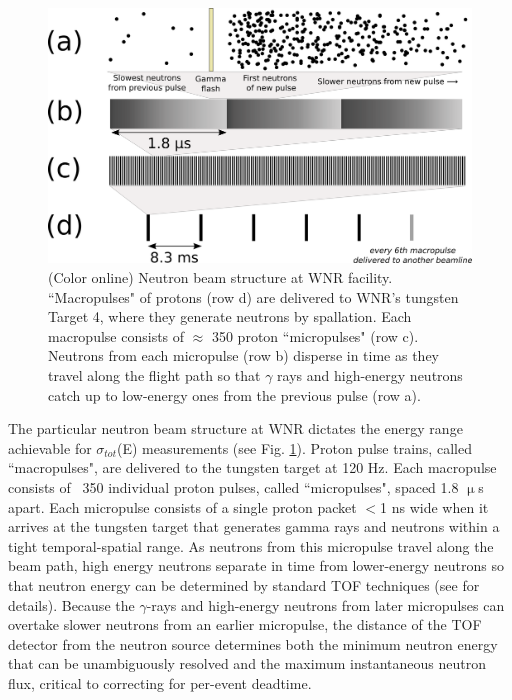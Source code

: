 \documentclass[twocolumn,secnumarabic,amssymb, nobibnotes, aps, prl,
superscriptaddress, nobalancelastpage]{revtex4}
\newcommand{\totEs}{\ensuremath{\sigma_{tot}}(E)\,\,}
\begin{document}
\begin{figure}
    \includegraphics[scale=0.4]{figures/beamStructure.png}
    \caption{(Color online) Neutron beam structure at WNR facility.
        ``Macropulses" of protons (row d) are delivered to
        WNR's tungsten Target 4, where they generate neutrons by spallation.
        Each macropulse consists of
        $\approx$ 350 proton ``micropulses" (row c). Neutrons
        from each micropulse (row b) disperse in
        time as they travel along the flight path so that $\gamma$ rays and high-energy 
    neutrons catch up to low-energy ones from the previous pulse (row a).}
    \label{BeamStructure}
\end{figure}

The particular neutron beam structure at WNR dictates the energy range
achievable for \totEs measurements (see Fig. \ref{BeamStructure}).
Proton pulse trains, called ``macropulses", are delivered to the tungsten target at 120 Hz.
Each macropulse consists of ~350 individual proton pulses, called ``micropulses", spaced 1.8 
$\upmu$s apart. Each micropulse consists of a single proton packet $<$1 ns wide when it 
arrives at the tungsten target that generates gamma rays and neutrons within a tight
temporal-spatial range. As neutrons from this micropulse travel along the beam path, 
high energy neutrons separate in time from lower-energy neutrons so that neutron
energy can be determined by standard TOF techniques (see \cite{Moore1980} for details).
Because the $\gamma$-rays and high-energy neutrons from later micropulses can
overtake slower neutrons from an earlier micropulse, the distance of the TOF
detector from the neutron source determines both the minimum neutron energy that can be 
unambiguously resolved and the maximum instantaneous neutron flux, critical to correcting
for per-event deadtime.
\end{document}
